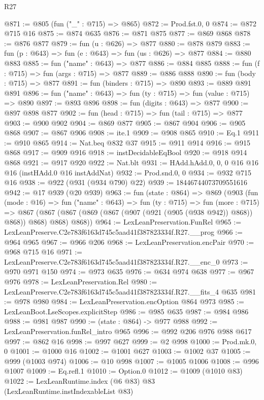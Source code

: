 \begin{lexlean}{R27}
\begin{coremodule}
@871 := @805 (fun ("_" : @715) => @865)
@872 := Prod.fst.{0, 0}
@874 := @872 @715 @16
@875 := @874 @635
@876 := @871 @875
@877 := @869 @868
@878 := @876 @877
@879 := fun (u : @626) => @877
@880 := @878 @879
@883 := fun (p : @643) => fun (e : @643) => fun (us : @626) => @877
@884 := @880 @883
@885 := fun ("name" : @643) => @877
@886 := @884 @885
@888 := fun (f : @715) => fun (args : @715) => @877
@889 := @886 @888
@890 := fun (body : @715) => @877
@891 := fun (binders : @715) => @890
@893 := @889 @891 @891
@896 := fun ("name" : @643) => fun (ty : @715) => fun (value : @715) => @890
@897 := @893 @896
@898 := fun (digits : @643) => @877
@900 := @897 @898 @877
@902 := fun (head : @715) => fun (tail : @715) => @877
@903 := @900 @902
@904 := @869 @877
@905 := @867 @904
@906 := @905 @868
@907 := @867 @906
@908 := ite.{1}
@909 := @908 @865
@910 := Eq.{1}
@911 := @910 @865
@914 := Nat.beq @832 @37
@915 := @911 @914
@916 := @915 @868
@917 := @909 @916
@918 := instDecidableEqBool
@920 := @918 @914 @868
@921 := @917 @920
@922 := Nat.blt
@931 := HAdd.hAdd.{0, 0, 0} @16 @16 @16 (instHAdd.{0} @16 instAddNat)
@932 := Prod.snd.{0, 0}
@934 := @932 @715 @16
@938 := @922 (@931 (@934 @790) @22)
@939 := 18446744073709551616
@942 := @17 @939 (@20 @939)
@963 := fun (state : @864) =>
  @869
    (@903
      (fun (mode : @16) =>
      fun ("name" : @643) =>
      fun (ty : @715) =>
      fun (more : @715) =>
      @867 (@867 (@867 (@869 (@867 (@907 (@921 (@905 (@938 @942)) @868)) @868)) @868) @868) @868))
@964 := LexLeanPreservation.FunRel
@965 := LexLeanPreserve.C2e783f6163d745c5aad41f387823334f.R27.__prog
@966 := @964 @965
@967 := @966 @206
@968 := LexLeanPreservation.encPair
@970 := @968 @715 @16
@971 := LexLeanPreserve.C2e783f6163d745c5aad41f387823334f.R27.__enc_0
@973 := @970 @971 @150
@974 := @973 @635
@976 := @634 @974 @638
@977 := @967 @976
@978 := LexLeanPreservation.Rel
@980 := LexLeanPreserve.C2e783f6163d745c5aad41f387823334f.R27.__fits_4 @635
@981 := @978 @980
@984 := LexLeanPreservation.encOption @864 @973
@985 := LexLeanBoot.LseScopes.explicitStep
@986 := @985 @635
@987 := @984 @986
@988 := @981 @987
@990 := (state : @864) -> @977 @988
@992 := LexLeanPreservation.funRel_intro @965
@996 := @992 @206 @976 @988 @617
@997 := @862 @16
@998 := @997 @627
@999 := @2 @998
@1000 := Prod.mk.{0, 0}
@1001 := @1000 @16
@1002 := @1001 @627
@1003 := @1002 @37
@1005 := @999 (@1003 @974)
@1006 := @10 @998
@1007 := @1005 @1006
@1008 := @996 @1007
@1009 := Eq.refl.{1}
@1010 := Option.{0}
@1012 := @1009 (@1010 @83)
@1022 := LexLeanRuntime.index
    (@6 @83)
    @83
    (LexLeanRuntime.instIndexableList @83)

\end{coremodule}
\end{lexlean}
